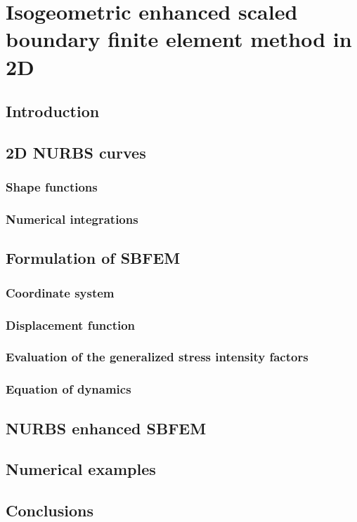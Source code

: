 
\chapter{Isogeometric enhanced scaled boundary finite element method in 2D}

\section{Introduction}

\section{2D NURBS curves}

    \subsection{Shape functions}

    \subsection{Numerical integrations}

\section{Formulation of SBFEM}

    \subsection{Coordinate system}

    \subsection{Displacement function}

    \subsection{Evaluation of the generalized stress intensity factors}

    \subsection{Equation of dynamics}

\section{NURBS enhanced SBFEM}

\section{Numerical examples}

\section{Conclusions}
